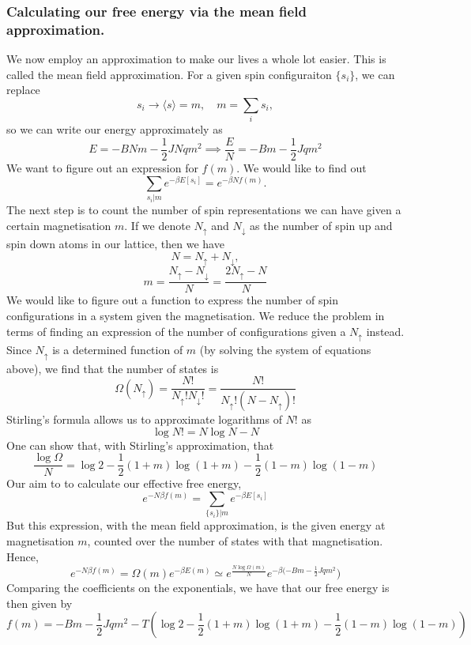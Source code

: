 \documentclass[11pt, oneside]{article}   	%
\begin{document}
\subsubsection{Calculating our free energy via the mean field approximation.}
We now employ an approximation to make our lives a whole lot easier. This is called the mean field approximation. For a given spin configuraiton $\{ s_i \} $, we can replace \[ 
	s_i  \rightarrow \langle s \rangle  = m, \quad 
	m = \sum_i s_i, 
\] 
so we can write our energy approximately as 
\[
	E = - BNm - \frac{1}{2} JN q m^2 \implies \frac{E}{N} =  - Bm - \frac{1}{2} J qm^2 
\]
We want to figure out an expression for $f(m)$. 
We would like to find out 
\[ 
	\sum_{s_i | m} e^{ - \beta E[s_i]} = e^{ - \beta N f(m)}. 
\] 
The next step is to count the number of spin representations we can have given a certain magnetisation  $m$. If we denote $N_{\uparrow}$ and $N_{\downarrow}$ as the number of spin up and spin down atoms in our lattice, then we have 
\[ 
	N  = N_{\uparrow} + N_{\downarrow}, 
 \] 
 \[ 
 	m = \frac{N_{\uparrow} - N_{\downarrow}}{N}  = \frac{2N_{\uparrow}  - N}{ N} 
  \] 
 We would like to figure out a function to express the number of spin configurations in a system given the magnetisation. We reduce the problem in terms of finding an expression of the number of configurations given a $N_{\uparrow}$ instead. 
Since $N_{\uparrow}$ is a determined function of $m$ (by solving the system of equations above), we find that the number of states is 
\[
	\Omega(N_{\uparrow}) = \frac{N !}{N_{\uparrow}! N_{\downarrow} !} = \frac{ N!}{ N_\uparrow ! ( N  - N_\uparrow)! }  
\]
Stirling's formula allows us to approximate logarithms of $N!$ as 
\[ 
	\log N!  = N \log N   - N 
\]
One can show that, with Stirling's approximation, that 
\[ 
 	\frac{ \log \Omega}{ N }  = \log 2  - \frac{1}{2} (1  +m) \log ( 1 + m)   - \frac{1}{2}(  1 - m ) \log (1 - m) 
\] 
Our aim to to calculate our effective free energy, 
\[ 
	e^{ - N\beta  f(m) } = \sum_{ \{ s_i \} | m } e^ { - \beta E [ s_i ]}\] 
But this expression, with the mean field approximation, is the given energy at magnetisation $m$, counted over the number of states with that magnetisation. Hence, 
\[ 
	e^{ - N \beta f( m) }  = \Omega(m) e^ { - \beta E( m ) } \simeq e^{ \frac{ N \log \Omega ( m) }{ N } } e^{  - \beta ( - B m - \frac{ 1}{ 2} J q m^2 }) \] 
Comparing the coefficients on the exponentials, we have that our free energy is then given by 
\[ 
	f(m) = - Bm  - \frac{1}{ 2} Jqm^2  -T \left( \log 2 - \frac{1}{2} ( 1 + m ) \log ( 1 + m ) - \frac{ 1}{2} ( 1- m ) \log ( 1- m ) \right) 
\] 
\end{document}
